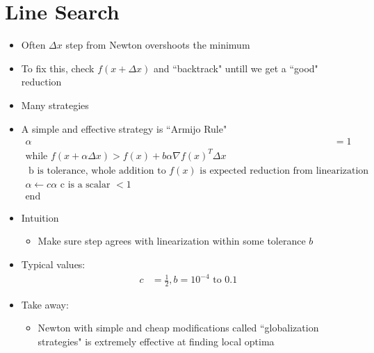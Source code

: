 \documentclass[11pt]{article}
\begin{document}
\section{Line Search}
\begin{itemize}
    \item Often $\Delta x$ step from Newton overshoots the minimum
    \item To fix this, check $f(x + \Delta x)$ and ``backtrack" untill we get a ``good" reduction
    \item Many strategies 
    \item A simple and effective strategy is ``Armijo Rule"
    \begin{align*}
        \alpha &= 1
        \\
        \text{while } f(x+\alpha\Delta x) > f(x) + b\alpha\nabla f(x)^T\Delta x
        \\ \text{ b is tolerance, whole addition to } f(x) \text{ is expected reduction from linearization}
        \\
        \alpha \leftarrow c\alpha \text{ c is a scalar } < 1
        \\
        \text{end}
    \end{align*}
    \item Intuition
    \begin{itemize}
        \item Make sure step agrees with linearization within some tolerance $b$
    \end{itemize}
    \item Typical values:
    \begin{align*}
        c &= \frac{1}{2}, b=10^{-4} \text{ to } 0.1
    \end{align*}
    \item Take away:
    \begin{itemize}
        \item Newton with simple and cheap modifications called ``globalization strategies" is extremely effective at finding local optima
    \end{itemize}
\end{itemize}
\end{document}
